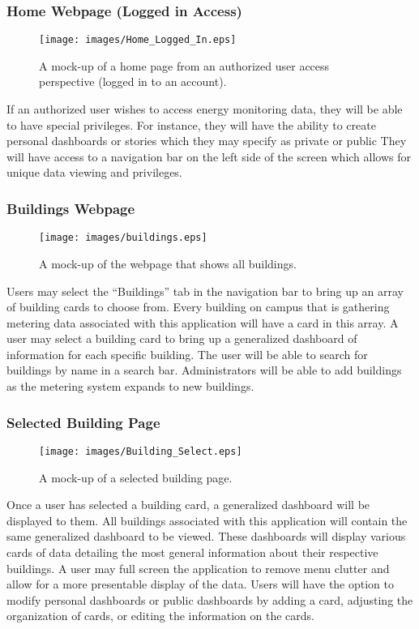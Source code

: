 \documentclass[journal,10pt,onecolumn,compsoc]{IEEEtran}
\begin{document}
	\subsubsection{Home Webpage (Logged in Access)}
    \begin{figure}[H]
        \centering
        \texttt{[image: images/Home\_Logged\_In.eps]}
        \caption{A mock-up of a home page from an authorized user access perspective (logged in to an account).}
    \end{figure}
	If an authorized user wishes to access energy monitoring data, they will be able to have special privileges.
	For instance, they will have the ability to create personal dashboards or stories which they may specify as private or public
	They will have access to a navigation bar on the left side of the screen which allows for unique data viewing and privileges. 
	
	
    \subsubsection{Buildings Webpage} 
    \begin{figure}[H]
        \centering
        \texttt{[image: images/buildings.eps]}
        \caption{A mock-up of the webpage that shows all buildings.}
    \end{figure}
	Users may select the ``Buildings'' tab in the navigation bar to bring up an array of building cards to choose from.
	Every building on campus that is gathering metering data associated with this application will have a card in this array.
	A user may select a building card to bring up a generalized dashboard of information for each specific building. 
	The user will be able to search for buildings by name in a search bar. Administrators will be able to add buildings
	as the metering system expands to new buildings.
	
    \subsubsection{Selected Building Page}
    \begin{figure}[H]
        \centering
        \texttt{[image: images/Building\_Select.eps]}
        \caption{A mock-up of a selected building page.}
    \end{figure}
	Once a user has selected a building card, a generalized dashboard will be displayed to them.
	All buildings associated with this application will contain the same generalized dashboard to be viewed.
	These dashboards will display various cards of data detailing the most general information about their respective buildings.
	A user may full screen the application to remove menu clutter and allow for a more presentable display of the data. 
	Users will have the option to modify personal dashboards or public dashboards by adding a card, adjusting the organization of cards, or editing the information on the cards.
	
\end{document}
